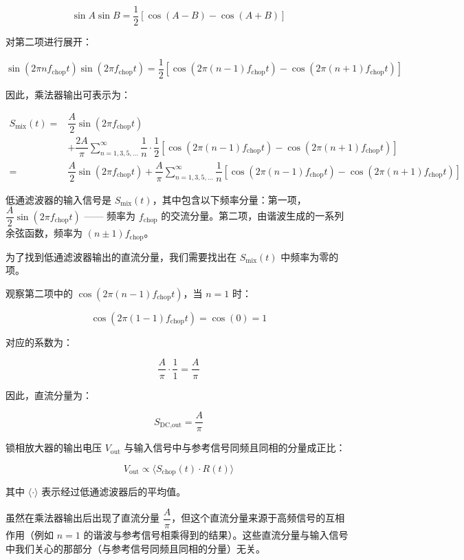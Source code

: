 \documentclass[dvipsnames, svgnames,a4paper,11pt]{article}
\begin{document}
\[
\sin A \sin B = \dfrac{1}{2} [\cos(A - B) - \cos(A + B)]
\]

对第二项进行展开：

\[
\sin(2\pi n f_{\text{chop}} t) \sin(2\pi f_{\text{chop}} t) = \dfrac{1}{2} \left[ \cos(2\pi (n - 1) f_{\text{chop}} t) - \cos(2\pi (n + 1) f_{\text{chop}} t) \right]
\]

因此，乘法器输出可表示为：

\[
\begin{aligned}
	S_{\text{mix}}(t) = & \dfrac{A}{2} \sin(2\pi f_{\text{chop}} t) \\
	& + \dfrac{2A}{\pi} \sum_{n=1,3,5,\dots}^{\infty} \dfrac{1}{n} \cdot \dfrac{1}{2} \left[ \cos(2\pi (n - 1) f_{\text{chop}} t) - \cos(2\pi (n + 1) f_{\text{chop}} t) \right] \\
	= & \dfrac{A}{2} \sin(2\pi f_{\text{chop}} t) + \dfrac{A}{\pi} \sum_{n=1,3,5,\dots}^{\infty} \dfrac{1}{n} \left[ \cos(2\pi (n - 1) f_{\text{chop}} t) - \cos(2\pi (n + 1) f_{\text{chop}} t) \right]
\end{aligned}
\]

低通滤波器的输入信号是 \( S_{\text{mix}}(t) \)，其中包含以下频率分量：第一项，\( \dfrac{A}{2} \sin(2\pi f_{\text{chop}} t) \) —— 频率为 \( f_{\text{chop}} \) 的交流分量。第二项，由谐波生成的一系列余弦函数，频率为 \( (n \pm 1) f_{\text{chop}} \)。

为了找到低通滤波器输出的直流分量，我们需要找出在 \( S_{\text{mix}}(t) \) 中频率为零的项。

观察第二项中的 \( \cos(2\pi (n - 1) f_{\text{chop}} t) \)，当 \( n = 1 \) 时：

\[
\cos(2\pi (1 - 1) f_{\text{chop}} t) = \cos(0) = 1
\]

对应的系数为：

\[
\dfrac{A}{\pi} \cdot \dfrac{1}{1} = \dfrac{A}{\pi}
\]

因此，直流分量为：

\[
S_{\text{DC,out}} = \dfrac{A}{\pi}
\]

锁相放大器的输出电压 \( V_{\text{out}} \) 与输入信号中与参考信号同频且同相的分量成正比：

\[
V_{\text{out}} \propto \langle S_{\text{chop}}(t) \cdot R(t) \rangle
\]

其中 \( \langle \cdot \rangle \) 表示经过低通滤波器后的平均值。

虽然在乘法器输出后出现了直流分量 \( \dfrac{A}{\pi} \)，但这个直流分量来源于高频信号的互相作用（例如 \( n = 1 \) 的谐波与参考信号相乘得到的结果）。这些直流分量与输入信号中我们关心的那部分（与参考信号同频且同相的分量）无关。
\end{document}
